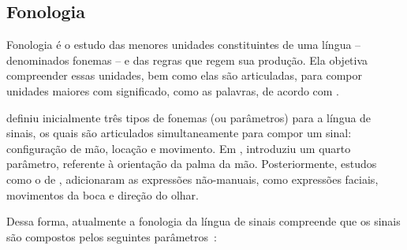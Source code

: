 \subsection{Fonologia}
\label{sec:linguistica-fonologia}

Fonologia é o estudo das menores unidades constituintes de uma língua -- denominados fonemas -- e das regras que regem sua produção. Ela objetiva compreender essas unidades, bem como elas são articuladas, para compor unidades maiores com significado, como as palavras, de acordo com . 






 definiu inicialmente três tipos de fonemas (ou parâmetros) para a língua de sinais, os quais são articulados simultaneamente para compor um sinal: configuração de mão, locação e movimento. Em \citeyear{battison-1974-phono-deletion}, \citeauthor{battison-1974-phono-deletion} introduziu um quarto parâmetro, referente à orientação da palma da mão. Posteriormente, estudos como o de , adicionaram as expressões não-manuais, como expressões faciais, movimentos da boca e direção do olhar.

Dessa forma, atualmente a fonologia da língua de sinais compreende que os sinais são compostos pelos seguintes parâmetros~\cite{stewart-2021-barrons-asl,jay-2011-dont-just-sign,quadros-2004-estudos-linguisticos}:


